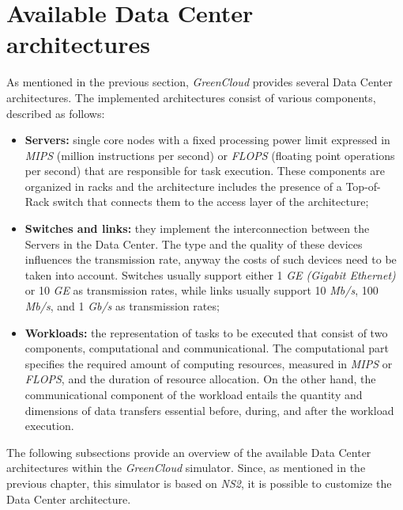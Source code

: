 \section{Available Data Center architectures} \label{chapter:architectures}
As mentioned in the previous section, \emph{GreenCloud} provides several Data Center architectures. The implemented architectures consist of various components, described as follows:
\begin{itemize}
    \item \textbf{Servers:} single core nodes with a fixed processing power limit expressed in \emph{MIPS} (million instructions per second) or \emph{FLOPS} (floating point operations per second) that are responsible for task execution. These components are organized in racks and the architecture includes the presence of a Top-of-Rack switch that connects them to the access layer of the architecture;
    \item \textbf{Switches and links:} they implement the interconnection between the Servers in the Data Center. The type and the quality of these devices influences the transmission rate, anyway the costs of such devices need to be taken into account. Switches usually support either 1 \emph{GE (Gigabit Ethernet)} or 10 \emph{GE} as transmission rates, while links usually support 10 \emph{Mb/s}, 100 \emph{Mb/s}, and 1 \emph{Gb/s} as transmission rates;
    \item \textbf{Workloads:} the representation of tasks to be executed that consist of two components, computational and communicational. The computational part specifies the required amount of computing resources, measured in \emph{MIPS} or \emph{FLOPS}, and the duration of resource allocation. On the other hand, the communicational component of the workload entails the quantity and dimensions of data transfers essential before, during, and after the workload execution.
\end{itemize}
The following subsections provide an overview of the available Data Center architectures within the \emph{GreenCloud} simulator. Since, as mentioned in the previous chapter, this simulator is based on \emph{NS2}, it is possible to customize the Data Center architecture. 

